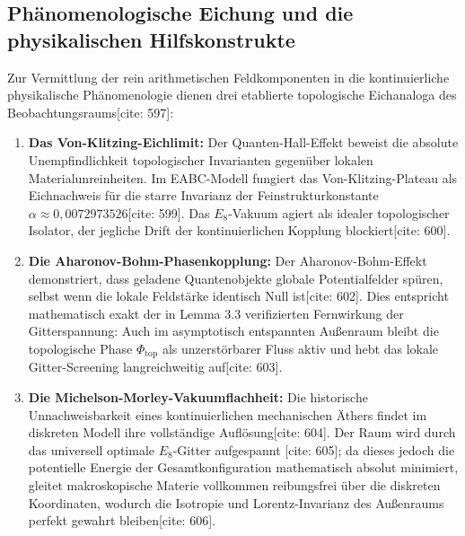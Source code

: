 \documentclass[11pt,a4paper]{article}
\newcommand{\Eoct}{E_8}
\theoremstyle{definition}
\begin{document}
	\subsection{Phänomenologische Eichung und die physikalischen Hilfskonstrukte}
	Zur Vermittlung der rein arithmetischen Feldkomponenten in die kontinuierliche physikalische Phänomenologie dienen drei etablierte topologische Eichanaloga des Beobachtungsraums[cite: 597]:
	\begin{enumerate}
		\item \textbf{Das Von-Klitzing-Eichlimit:} Der Quanten-Hall-Effekt beweist die absolute Unempfindlichkeit topologischer Invarianten gegenüber lokalen Materialunreinheiten. Im EABC-Modell fungiert das Von-Klitzing-Plateau als Eichnachweis für die starre Invarianz der Feinstrukturkonstante $\alpha \approx 0{,}0072973526$[cite: 599]. Das $\Eoct$-Vakuum agiert als idealer topologischer Isolator, der jegliche Drift der kontinuierlichen Kopplung blockiert[cite: 600].
		\item \textbf{Die Aharonov-Bohm-Phasenkopplung:} Der Aharonov-Bohm-Effekt demonstriert, dass geladene Quantenobjekte globale Potentialfelder spüren, selbst wenn die lokale Feldstärke identisch Null ist[cite: 602]. Dies entspricht mathematisch exakt der in Lemma 3.3 verifizierten Fernwirkung der Gitterspannung: Auch im asymptotisch entspannten Außenraum bleibt die topologische Phase $\Phi_{\text{top}}$ als unzerstörbarer Fluss aktiv und hebt das lokale Gitter-Screening langreichweitig auf[cite: 603].
		\item \textbf{Die Michelson-Morley-Vakuumflachheit:} Die historische Unnachweisbarkeit eines kontinuierlichen mechanischen Äthers findet im diskreten Modell ihre vollständige Auflösung[cite: 604]. Der Raum wird durch das universell optimale $\Eoct$-Gitter aufgespannt [cite: 605]; da dieses jedoch die potentielle Energie der Gesamtkonfiguration mathematisch absolut minimiert, gleitet makroskopische Materie vollkommen reibungsfrei über die diskreten Koordinaten, wodurch die Isotropie und Lorentz-Invarianz des Außenraums perfekt gewahrt bleiben[cite: 606].
	\end{enumerate}
	
\end{document}
